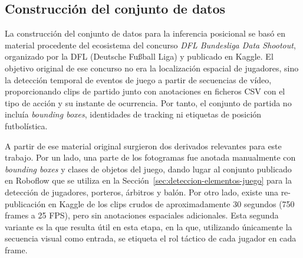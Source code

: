 \subsection{Construcción del conjunto de datos}
\label{subsec:dataset-inferencia-posicional}

La construcción del conjunto de datos para la inferencia posicional se basó en material procedente del ecosistema del concurso \textit{DFL Bundesliga Data Shootout}, organizado por la DFL (Deutsche Fußball Liga) y publicado en Kaggle. El objetivo original de ese concurso no era la localización espacial de jugadores, sino la detección temporal de eventos de juego a partir de secuencias de vídeo, proporcionando clips de partido junto con anotaciones en ficheros CSV con el tipo de acción y su instante de ocurrencia. Por tanto, el conjunto de partida no incluía \textit{bounding boxes}, identidades de tracking ni etiquetas de posición futbolística.

A partir de ese material original surgieron dos derivados relevantes para este trabajo. Por un lado, una parte de los fotogramas fue anotada manualmente con \textit{bounding boxes} y clases de objetos del juego, dando lugar al conjunto publicado en Roboflow que se utiliza en la Sección~\ref{sec:deteccion-elementos-juego} para la detección de jugadores, porteros, árbitros y balón. Por otro lado, existe una re-publicación en Kaggle de los clips crudos de aproximadamente 30 segundos (750 frames a 25 FPS), pero sin anotaciones espaciales adicionales. Esta segunda variante es la que resulta útil en esta etapa, en la que, utilizando únicamente la secuencia visual como entrada, se etiqueta el rol táctico de cada jugador en cada frame.

